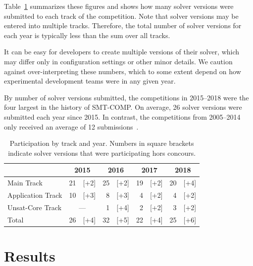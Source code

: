 \documentclass[dvipsnames,table,twoside,11pt]{article}
\newcommand{\maintrack}{Main Track\xspace}
\newcommand{\apptrack}{Application Track\xspace}
\newcommand{\ucoretrack}{Unsat-Core Track\xspace}
\begin{document}
Table~\ref{table:participation-by-track} summarizes these figures and
shows how many solver versions were submitted to each track of the
competition.  Note that solver versions may be entered into multiple
tracks.  Therefore, the total number of solver versions for each year
is typically less than the sum over all tracks.

It can be easy for developers to create multiple versions of their
solver, which may differ only in configuration settings or other minor
details.  We caution against over-interpreting these numbers, which to
some extent depend on how experimental development teams were in any
given year.

By number of solver versions submitted, the competitions in 2015--2018
were the four largest in the history of SMT-COMP.  On average, 26
solver versions were submitted each year since 2015.  In contrast, the
competitions from 2005--2014 only received an average of 12
submissions~\cite{CDW14}.

\begin{table}
  \caption{Participation by track and year.  Numbers in square
    brackets indicate solver versions that were participating hors
    concours.}
  \label{table:participation-by-track}
  \centering
  \begin{tabular}{lr@{\,\,}rr@{\,\,}rr@{\,\,}rr@{\,\,}r}
    \toprule
                      & \multicolumn{2}{c}{2015} & \multicolumn{2}{c}{2016} & \multicolumn{2}{c}{2017} & \multicolumn{2}{c}{2018} \\
    \midrule
    \maintrack   & 21 &               [+2] & 25 & [+2] & 19 & [+2] & 20 & [+4] \\
    \apptrack    & 10 &               [+3] &  8 & [+3] &  4 & [+2] &  4 & [+2] \\
    \ucoretrack  & \multicolumn{2}{c}{---} &  1 & [+4] &  2 & [+2] &  3 & [+2] \\
    \midrule
    Total             & 26 &               [+4] & 32 & [+5] & 22 & [+4] & 25 & [+6] \\
    \bottomrule
  \end{tabular}
\end{table}


\section{Results}
\label{sec:results}
\end{document}
